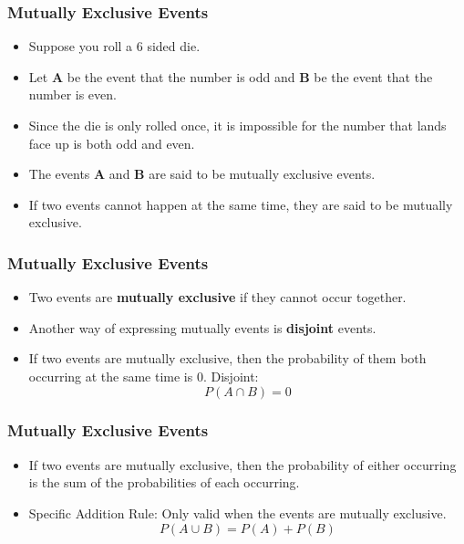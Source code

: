 \documentclass{beamer}
\begin{document}
\begin{frame}
\frametitle{Mutually Exclusive Events}
\Large
\begin{itemize}
\item Suppose you roll a 6 sided die. \item Let \textbf{A} be the event that the number is odd and \textbf{B} be the event that the number is even. 
\item Since the die is only rolled once, it is impossible for the number that lands face up is both odd and even. \item The events \textbf{A} and \textbf{B} are said to be mutually exclusive events. \item If two events cannot happen at the same time, they are said to be mutually exclusive.


\end{itemize}
\end{frame}
\begin{frame}
\frametitle{Mutually Exclusive Events}
\Large
\begin{itemize}
\item Two events are \textbf{mutually exclusive} if they cannot occur together. 
\item Another way of expressing mutually events is \textbf{disjoint} events.
\item If two events are mutually exclusive, then the probability of them both occurring at the same time is 0.
   Disjoint:  \[P(A \cap B) = 0\]
\end{itemize}
\end{frame}
\begin{frame}
\frametitle{Mutually Exclusive Events}
\Large
\begin{itemize}
\item If two events are mutually exclusive, then the probability of either occurring is the sum of the probabilities of each occurring.
\item Specific Addition Rule: Only valid when the events are mutually exclusive.
 \[P(A \cup B) = P(A) + P(B)\]
\end{itemize}   
\end{frame}
\end{document}
